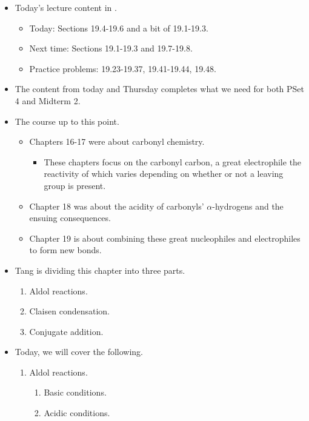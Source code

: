 \documentclass[../notes.tex]{subfiles}
\begin{document}
\begin{itemize}
\begin{itemize}
\begin{itemize}
        \end{itemize}
    \end{itemize}
    \item Today's lecture content in \textcite{bib:SolomonsEtAl}.
    \begin{itemize}
        \item Today: Sections 19.4-19.6 and a bit of 19.1-19.3.
        \item Next time: Sections 19.1-19.3 and 19.7-19.8.
        \item Practice problems: 19.23-19.37, 19.41-19.44, 19.48.
    \end{itemize}
    \item The content from today and Thursday completes what we need for both PSet 4 and Midterm 2.
    \item The course up to this point.
    \begin{itemize}
        \item Chapters 16-17 were about carbonyl chemistry.
        \begin{itemize}
            \item These chapters focus on the carbonyl carbon, a great electrophile the reactivity of which varies depending on whether or not a leaving group is present.
        \end{itemize}
        \item Chapter 18 was about the acidity of carbonyls' $\alpha$-hydrogens and the ensuing consequences.
        \item Chapter 19 is about combining these great nucleophiles and electrophiles to form new  bonds.
    \end{itemize}
    \item Tang is dividing this chapter into three parts.
    \begin{enumerate}[label={\Roman*.}]
        \item Aldol reactions.
        \item Claisen condensation.
        \item Conjugate addition.
    \end{enumerate}
    \item Today, we will cover the following.
    \begin{enumerate}[label={\Roman*.}]
        \item Aldol reactions.
        \begin{enumerate}[label={\Alph*.}]
            \item Basic conditions.
            \item Acidic conditions.

\end{enumerate}
\end{enumerate}
\end{itemize}
\end{document}
